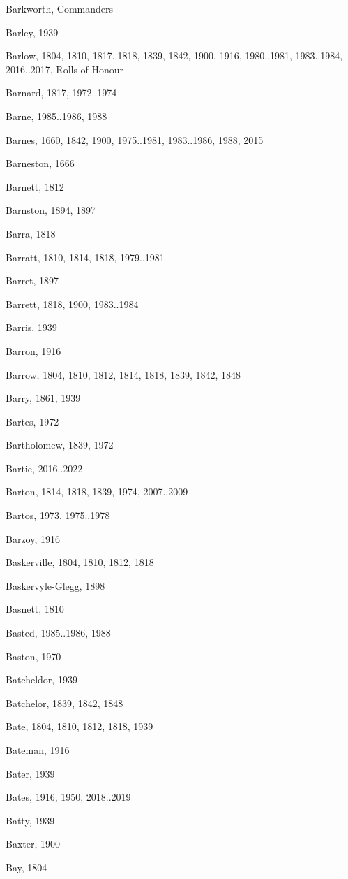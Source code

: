 \begin{theindex}
\item Barkworth, Commanders
\item Barley, 1939
\item Barlow, 1804, 1810, 1817..1818, 1839, 1842, 1900, 1916, 1980..1981, 1983..1984, 2016..2017, Rolls of Honour
\item Barnard, 1817, 1972..1974
\item Barne, 1985..1986, 1988
\item Barnes, 1660, 1842, 1900, 1975..1981, 1983..1986, 1988, 2015
\item Barneston, 1666
\item Barnett, 1812
\item Barnston, 1894, 1897
\item Barra, 1818
\item Barratt, 1810, 1814, 1818, 1979..1981
\item Barret, 1897
\item Barrett, 1818, 1900, 1983..1984
\item Barris, 1939
\item Barron, 1916
\item Barrow, 1804, 1810, 1812, 1814, 1818, 1839, 1842, 1848
\item Barry, 1861, 1939
\item Bartes, 1972
\item Bartholomew, 1839, 1972
\item Bartie, 2016..2022
\item Barton, 1814, 1818, 1839, 1974, 2007..2009
\item Bartos, 1973, 1975..1978
\item Barzoy, 1916
\item Baskerville, 1804, 1810, 1812, 1818
\item Baskervyle-Glegg, 1898
\item Basnett, 1810
\item Basted, 1985..1986, 1988
\item Baston, 1970
\item Batcheldor, 1939
\item Batchelor, 1839, 1842, 1848
\item Bate, 1804, 1810, 1812, 1818, 1939
\item Bateman, 1916
\item Bater, 1939
\item Bates, 1916, 1950, 2018..2019
\item Batty, 1939
\item Baxter, 1900
\item Bay, 1804

\end{theindex}
